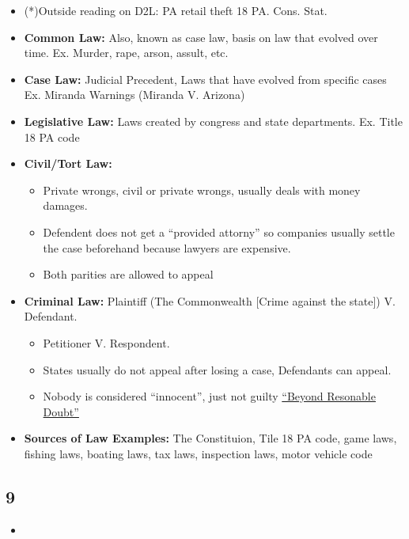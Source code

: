 \documentclass[12pt]{article}
\begin{document}
\begin{itemize}
		  \item (*)Outside reading on D2L: PA retail theft 18 PA. Cons. Stat.
		  \item \textbf{Common Law:} Also, known as case law, basis on law that evolved over time. Ex.
					 Murder, rape, arson, assult, etc.
		  \item \textbf{Case Law:} Judicial Precedent, Laws that have evolved from specific cases
					 Ex. Miranda Warnings (Miranda V. Arizona)
		  \item \textbf{Legislative Law:} Laws created by congress and state departments. Ex. Title 18 PA code
		  \item \textbf{Civil/Tort Law:} 
						\begin{itemize}
								  \item Private wrongs, civil or private wrongs, usually deals with money damages.
								  \item Defendent does not get a ``provided attorny'' so companies usually 
											 settle the case beforehand because lawyers are expensive. 
								  \item Both parities are allowed to appeal
						\end{itemize}
		  \item \textbf{Criminal Law:} Plaintiff (The Commonwealth [Crime against the state]) V. Defendant.
						\begin{itemize}
								  \item Petitioner V. Respondent. 
								  \item States usually do not appeal after losing a case, Defendants can appeal. 
								  \item Nobody is considered ``innocent'',
											 just not guilty \underline{``Beyond Resonable Doubt''}
						\end{itemize}
		  \item \textbf{Sources of Law Examples:} The Constituion, Tile 18 PA code, game laws, fishing laws,
					 boating laws, tax laws, inspection laws, motor vehicle code
\end{itemize}

\subsection*{9}

\begin{itemize}
		  \item 
\end{itemize}
\end{document}
